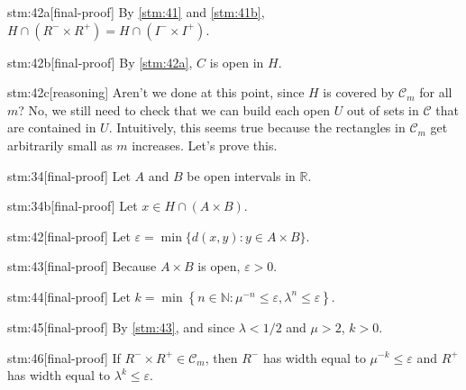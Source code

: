 \documentclass{article}
\begin{document}
\begin{stm}{stm:42a}[final-proof]
By \ref{stm:41} and \ref{stm:41b}, $H \cap (R^- \times R^+) = H \cap (I^- \times I^+)$.
\end{stm}

\begin{stm}{stm:42b}[final-proof]
By \ref{stm:42a}, $C$ is open in $H$.
\end{stm}

\begin{stm}{stm:42c}[reasoning]
Aren’t we done at this point, since $H$ is covered by $\mathcal{C}_m$ for all $m$? No, we still need to check that we can build each open $U$ out of sets in $\mathcal{C}$ that are contained in $U$. Intuitively, this seems true because the rectangles in $\mathcal{C}_m$ get arbitrarily small as $m$ increases. Let's prove this.
\end{stm}

\begin{stm}{stm:34}[final-proof]
Let $A$ and $B$ be open intervals in $\mathbb{R}$.
\end{stm}

\begin{stm}{stm:34b}[final-proof]
Let $x \in H \cap (A \times B)$.
\end{stm}

\begin{stm}{stm:42}[final-proof]
Let $\varepsilon = \min\{ d(x, y) : y \in A \times B \}$. 
\end{stm}

\begin{stm}{stm:43}[final-proof]
Because $A \times B$ is open, $\varepsilon > 0$.
\end{stm}

\begin{stm}{stm:44}[final-proof]
Let $k = \min \left\{ n \in \mathbb{N} : \mu^{-n} \leq \varepsilon, \lambda^n \leq \varepsilon \right\}$.
\end{stm}

\begin{stm}{stm:45}[final-proof]
By \ref{stm:43}, and since $\lambda < 1/2$ and $\mu > 2$, $k > 0$.
\end{stm}

\begin{stm}{stm:46}[final-proof]
If $R^- \times R^+ \in \mathcal{C}_m$, then $R^-$ has width equal to $\mu^{-k} \leq \varepsilon$ and $R^+$ has width equal to $\lambda^k \leq \varepsilon$.
\end{stm}
\end{document}
